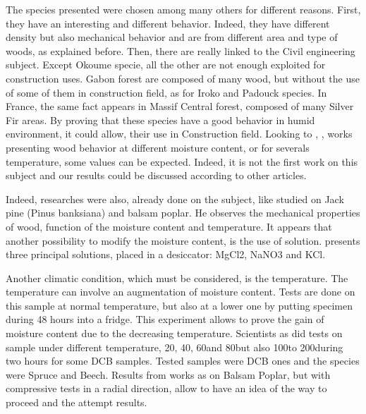 The species presented were chosen among many others for different reasons. First, they have an interesting and different behavior. Indeed, they have different density but also mechanical behavior and are from different area and type of woods, as explained before. Then, there are really linked to the Civil engineering subject. Except Okoume specie, all the other are not enough exploited for construction uses. Gabon forest are composed of many wood, but without the use of some of them in construction field, as for Iroko and Padouck species. In France, the same fact appears in Massif Central forest, composed of many Silver Fir areas. By proving that these species have a good behavior in humid environment, it could allow, their use in Construction field. Looking to \parencite{Kif1998}, \parencite{Ang2017}, \parencite{Huang2020} works presenting wood behavior at different moisture content, or \parencite{Seif2017} for severals temperature, some values can be expected. Indeed, it is not the first work on this subject and our results could be discussed according to other articles.

Indeed, researches were also, already done on the subject, like \parencite{Reference12} studied on Jack pine (Pinus banksiana) and balsam poplar. He observes the mechanical properties of wood, function of the moisture content and temperature. It appears that another possibility to modify the moisture content, is the use of solution. \parencite{Reference12} presents three principal solutions, placed in a desiccator: MgCl2, NaNO3 and KCl. 

Another climatic condition, which must be considered, is the temperature. The temperature can involve an augmentation of moisture content. Tests are done on this sample at normal temperature, but also at a lower one by putting specimen during 48 hours into a fridge. This experiment allows to prove the gain of moisture content due to the decreasing temperature. Scientists as \parencite{Reference13} did tests on sample under different temperature, 20\textcelsius, 40\textcelsius, 60\textcelsius and 80\textcelsius but also 100\textcelsius to 200\textcelsius during two hours for some DCB samples.
Tested samples were DCB ones and the species were Spruce and Beech. Results from works as \parencite{Reference12} on Balsam Poplar, but with compressive tests in a radial direction, allow to have an idea of the way to proceed and the attempt results. 

